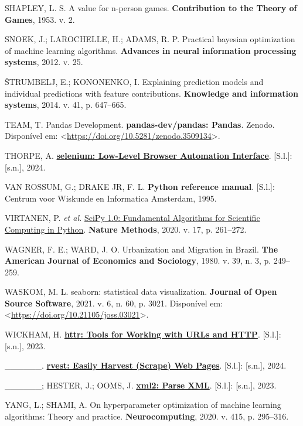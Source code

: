 \documentclass[
  12pt,
  a4paper,
]{scrreprt}
\newlength{\cslhangindent}
\newenvironment{CSLReferences}[2] %
 {\begin{list}{}{%
  \setlength{\itemindent}{0pt}
  \setlength{\leftmargin}{0pt}
  \setlength{\parsep}{0pt}
  \ifodd #1
   \setlength{\leftmargin}{\cslhangindent}
   \setlength{\itemindent}{-1\cslhangindent}
  \fi
  \setlength{\itemsep}{#2\baselineskip}}}
 {\end{list}}
\begin{document}
\begin{CSLReferences}{0}{1}
SHAPLEY, L. S. A value for n-person games. \textbf{Contribution to the
Theory of Games}, 1953. v. 2.

SNOEK, J.; LAROCHELLE, H.; ADAMS, R. P. Practical bayesian optimization
of machine learning algorithms. \textbf{Advances in neural information
processing systems}, 2012. v. 25.

ŠTRUMBELJ, E.; KONONENKO, I. Explaining prediction models and individual
predictions with feature contributions. \textbf{Knowledge and
information systems}, 2014. v. 41, p. 647--665.

TEAM, T. Pandas Development. \textbf{pandas-dev/pandas: Pandas}. Zenodo.
Disponível em:
\textless{}\url{https://doi.org/10.5281/zenodo.3509134}\textgreater.

THORPE, A.
\textbf{\href{https://CRAN.R-project.org/package=selenium}{selenium:
Low-Level Browser Automation Interface}}. {[}S.l.{]}: {[}s.n.{]}, 2024.

VAN ROSSUM, G.; DRAKE JR, F. L. \textbf{Python reference manual}.
{[}S.l.{]}: Centrum voor Wiskunde en Informatica Amsterdam, 1995.

VIRTANEN, P. \emph{et al.}
\href{https://doi.org/10.1038/s41592-019-0686-2}{{{SciPy} 1.0:
Fundamental Algorithms for Scientific Computing in Python}}.
\textbf{Nature Methods}, 2020. v. 17, p. 261--272.

WAGNER, F. E.; WARD, J. O. Urbanization and Migration in Brazil.
\textbf{The American Journal of Economics and Sociology}, 1980. v. 39,
n. 3, p. 249--259.

WASKOM, M. L. seaborn: statistical data visualization. \textbf{Journal
of Open Source Software}, 2021. v. 6, n. 60, p. 3021. Disponível em:
\textless{}\url{https://doi.org/10.21105/joss.03021}\textgreater.

WICKHAM, H. \textbf{\href{https://CRAN.R-project.org/package=httr}{httr:
Tools for Working with URLs and HTTP}}. {[}S.l.{]}: {[}s.n.{]}, 2023.

\_\_\_\_\_\_. \textbf{\href{https://rvest.tidyverse.org/}{rvest: Easily
Harvest (Scrape) Web Pages}}. {[}S.l.{]}: {[}s.n.{]}, 2024.

\_\_\_\_\_\_; HESTER, J.; OOMS, J.
\textbf{\href{https://xml2.r-lib.org/}{xml2: Parse XML}}. {[}S.l.{]}:
{[}s.n.{]}, 2023.

YANG, L.; SHAMI, A. On hyperparameter optimization of machine learning
algorithms: Theory and practice. \textbf{Neurocomputing}, 2020. v. 415,
p. 295--316.

\end{CSLReferences}
\end{document}
